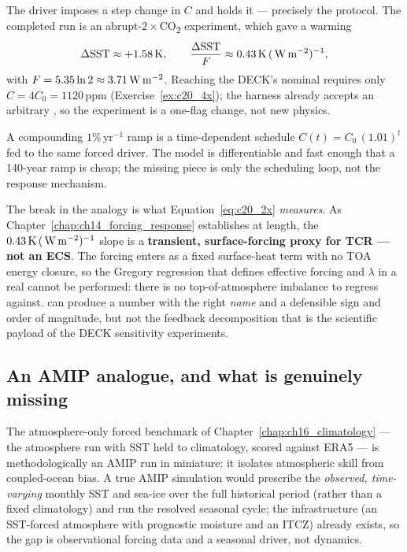 \begin{description}[leftmargin=1.5em,style=nextline]
\item[\code{abrupt-NxCO2}.]
  The driver imposes a step change in $C$ and holds it --- precisely the
   protocol. The completed run is an abrupt-$2\times$CO\textsubscript{2}
  experiment, which gave a warming
  \begin{equation}
    \Delta\mathrm{SST} \approx +1.58\,\mathrm{K}, \qquad
    \frac{\Delta\mathrm{SST}}{F} \approx 0.43\,\mathrm{K}\,(\,\mathrm{W\,m^{-2}})^{-1},
    \label{eq:c20_2x}
  \end{equation}
  with $F=5.35\ln 2\approx 3.71\,\mathrm{W\,m^{-2}}$. Reaching the DECK's nominal
   requires only $C=4C_0=1120\,$ppm
  (Exercise~\ref{ex:c20_4x}); the harness already accepts an arbitrary
  , so the experiment is a one-flag change, not new physics.
\item[\code{1pctCO2}.]
  A compounding $1\%\,\mathrm{yr^{-1}}$ ramp is a time-dependent schedule
  $C(t)=C_0\,(1.01)^{t}$ fed to the same forced driver. The model is differentiable
  and fast enough that a 140-year ramp is cheap; the missing piece is only the
  scheduling loop, not the response mechanism.
\end{description}

The break in the analogy is what Equation~\eqref{eq:c20_2x} \emph{measures}. As
Chapter~\ref{chap:ch14_forcing_response} establishes at length, the
$0.43\,\mathrm{K}\,(\,\mathrm{W\,m^{-2}})^{-1}$ slope is a \textbf{transient, surface-forcing proxy
for TCR --- not an ECS}. The forcing enters as a fixed surface-heat term with no
TOA energy closure, so the Gregory regression that defines effective forcing and
$\lambda$ in a real  cannot be performed: there is no
top-of-atmosphere imbalance to regress against. \model{} can produce a number with
the right \emph{name} and a defensible sign and order of magnitude, but not the
feedback decomposition that is the scientific payload of the DECK sensitivity
experiments.

\subsection{An AMIP analogue, and what is genuinely missing}\label{sec:c20_amip}

The atmosphere-only forced benchmark of Chapter~\ref{chap:ch16_climatology} ---
the \dino{} atmosphere run with SST held to climatology, scored against ERA5 --- is
methodologically an AMIP run in miniature: it isolates atmospheric skill from
coupled-ocean bias. A true AMIP simulation would prescribe the \emph{observed,
time-varying} monthly SST and sea-ice over the full historical period (rather than
a fixed climatology) and run the resolved seasonal cycle; the infrastructure (an
SST-forced \dino{} atmosphere with prognostic moisture and an ITCZ) already exists,
so the gap is observational forcing data and a seasonal driver, not dynamics.

